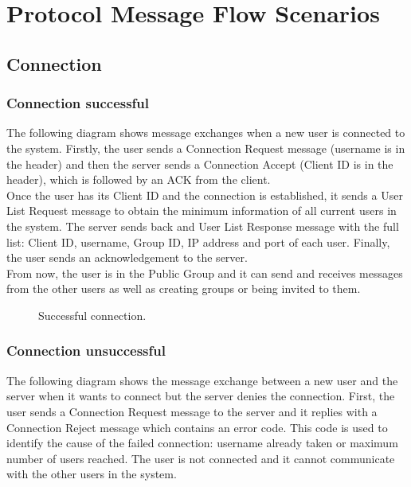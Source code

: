 \documentclass{article}
\begin{document}
\section{Protocol Message Flow Scenarios}
\subsection{Connection}
\subsubsection{Connection successful}
The following diagram shows message exchanges when a new user is connected to the system. Firstly, the user sends a Connection Request message (username is in the header) and then the server sends a Connection Accept (Client ID is in the header), which is followed by an ACK from the client.\\

Once the user has its Client ID and the connection is established, it sends a User List Request message to obtain the minimum information of all current users in the system. The server sends back and User List Response message with the full list: Client ID, username, Group ID, IP address and port of each user. Finally, the user sends an acknowledgement to the server.\\

From now, the user is in the Public Group and it can send and receives messages from the other users as well as creating groups or being invited to them.

\begin{figure}[H]
    \centering
    \begin{sequencediagram}

    \end{sequencediagram}
    \caption{Successful connection.}
\end{figure}

\subsubsection{Connection unsuccessful}
The following diagram shows the message exchange between a new user and the server when it wants to connect but the server denies the connection. First, the user sends a Connection Request message to the server and it replies with a Connection Reject message which contains an error code. This code is used to identify the cause of the failed connection: username already taken or maximum number of users reached. The user is not connected and it cannot communicate with the other users in the system.
\end{document}
